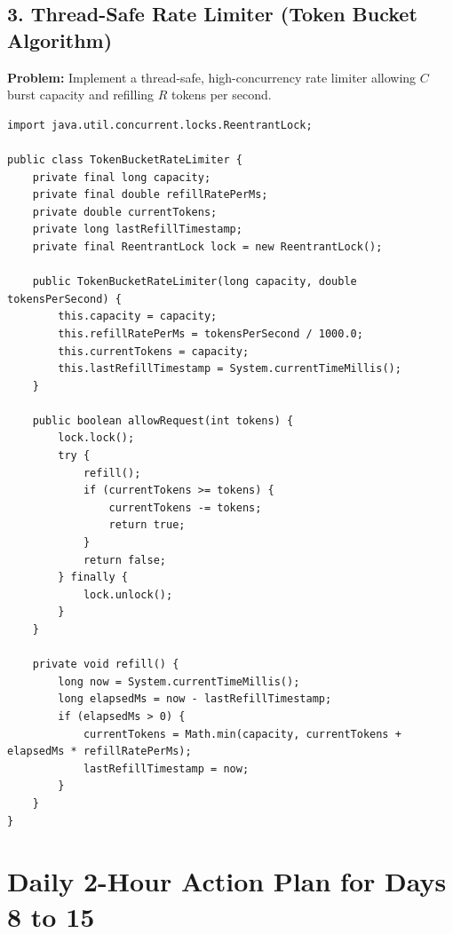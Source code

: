 \documentclass[10pt,journal,compsoc,onecolumn]{IEEEtran}
\begin{document}
\subsection{3. Thread-Safe Rate Limiter (Token Bucket Algorithm)}
\textbf{Problem:} Implement a thread-safe, high-concurrency rate limiter allowing $C$ burst capacity and refilling $R$ tokens per second.

\begin{verbatim}
import java.util.concurrent.locks.ReentrantLock;

public class TokenBucketRateLimiter {
    private final long capacity;
    private final double refillRatePerMs;
    private double currentTokens;
    private long lastRefillTimestamp;
    private final ReentrantLock lock = new ReentrantLock();

    public TokenBucketRateLimiter(long capacity, double tokensPerSecond) {
        this.capacity = capacity;
        this.refillRatePerMs = tokensPerSecond / 1000.0;
        this.currentTokens = capacity;
        this.lastRefillTimestamp = System.currentTimeMillis();
    }

    public boolean allowRequest(int tokens) {
        lock.lock();
        try {
            refill();
            if (currentTokens >= tokens) {
                currentTokens -= tokens;
                return true;
            }
            return false;
        } finally {
            lock.unlock();
        }
    }

    private void refill() {
        long now = System.currentTimeMillis();
        long elapsedMs = now - lastRefillTimestamp;
        if (elapsedMs > 0) {
            currentTokens = Math.min(capacity, currentTokens + elapsedMs * refillRatePerMs);
            lastRefillTimestamp = now;
        }
    }
}
\end{verbatim}

\section{Daily 2-Hour Action Plan for Days 8 to 15}
\label{sec:action_plan_vol2}
\end{document}
